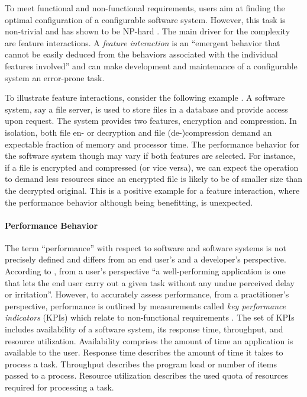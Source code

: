 To meet functional and non-functional requirements, users aim at finding the
optimal configuration of a configurable software system. However, this task is
non-trivial and has shown to be NP-hard \citep{white_selecting_2009}. The main
driver for the complexity are feature interactions. A \emph{feature
interaction} is an ``emergent behavior that cannot be easily deduced from the
behaviors associated with the individual features involved''
\citep{apel_feature-oriented_2013} and can make development and maintenance of
a configurable system an error-prone task.

To illustrate feature interactions, consider the following example
\citep{siegmund_performance-influence_2015}. A software system, say a file
server, is used to store files in a database and provide access upon request.
The system provides two features, encryption and compression. In
isolation, both file en- or decryption and file (de-)compression demand an
expectable fraction of memory and processor time. The performance behavior for
the software system though may vary if both features are selected. For
instance, if a file is encrypted and compressed (or vice versa), we can expect
the operation to demand less resources since an encrypted file is likely to be
of smaller size than the decrypted original.
This is a positive example for a feature interaction, where the performance
behavior although being benefitting, is unexpected.

\paragraph{Performance Behavior}
The term ``performance'' with respect to software and software systems is not
precisely defined and differs from an end user's and a developer’s perspective.
According to \cite{molyneaux_art_2014}, from a user’s perspective ``a well-performing
application is one that lets the end user carry out a given task without any
undue perceived delay or irritation''. However, to accurately assess
performance, from a practitioner’s perspective, performance is outlined by
measurements called \emph{key performance indicators} (KPIs) which relate to
non-functional requirements \citep{molyneaux_art_2014}. The set of KPIs includes
availability of a software system, its response time, throughput, and resource
utilization. Availability comprises the amount of time an application is
available to the user. Response time describes the amount of time it takes to
process a task. Throughput describes the program load or number of items passed
to a process. Resource utilization describes the used quota of resources
required for processing a task.

